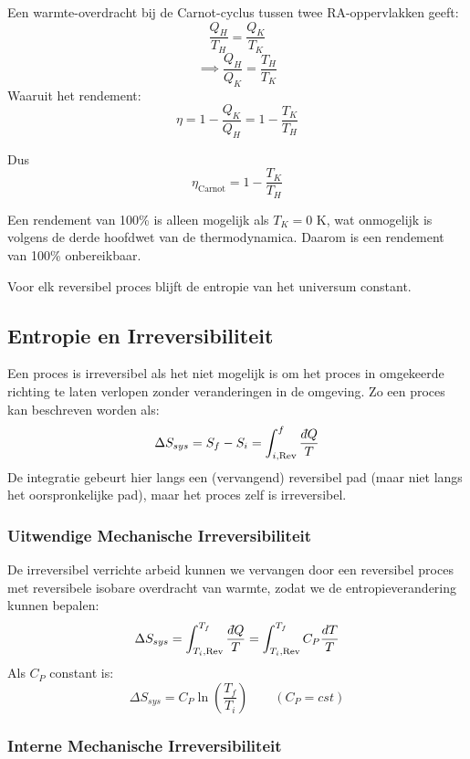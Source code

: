 Een warmte-overdracht bij de Carnot-cyclus tussen twee RA-oppervlakken geeft:
\[\frac{Q_H}{T_H} = \frac{Q_K}{T_K}\]
\[\implies \frac{Q_H}{Q_K} = \frac{T_H}{T_K}\]
Waaruit het rendement:
\[\eta = 1 - \frac{Q_K}{Q_H} = 1 - \frac{T_K}{T_H}\]

Dus
\[
\eta_{\text{Carnot}} = 1 - \frac{T_K}{T_H}
\]

Een rendement van 100\% is alleen mogelijk als \(T_K = 0\) K, wat onmogelijk is volgens de derde hoofdwet van de thermodynamica. Daarom is een rendement van 100\% onbereikbaar.

\begin{postulate}
    Voor elk reversibel proces blijft de entropie van het universum constant.
\end{postulate}

\subsection{Entropie en Irreversibiliteit}

\begin{definition}
    Een proces is irreversibel als het niet mogelijk is om het proces in omgekeerde richting te laten verlopen zonder veranderingen in de omgeving.
    Zo een proces kan beschreven worden als:
    \[\Delta S_{sys} = S_f-S_i = \int_{i, \text{Rev}}^{f} \frac{\dbar Q}{T}\]
    De integratie gebeurt hier langs een (vervangend) reversibel pad (maar niet langs het oorspronkelijke pad), maar het proces zelf is irreversibel.
\end{definition}

\subsubsection{Uitwendige Mechanische Irreversibiliteit}

De irreversibel verrichte arbeid kunnen we vervangen door een reversibel proces met reversibele isobare overdracht van warmte, zodat we de entropieverandering kunnen bepalen:
\[\Delta S_{sys} = \int_{T_i, \text{Rev}}^{T_f} \frac{\dbar Q}{T} = \int_{T_i, \text{Rev}}^{T_f} C_P\frac{dT}{T}\]
Als \(C_P\) constant is:
\[\Delta S_{sys} = C_P \ln \left(\frac{T_f}{T_i}\right) \qquad (C_P = cst)\]


\subsubsection{Interne Mechanische Irreversibiliteit}

